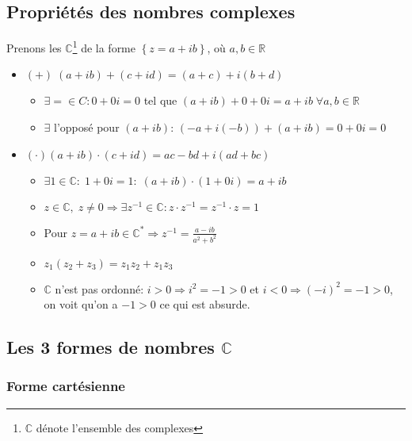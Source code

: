\documentclass[10pt,a4paper]{book}
\newcommand{\R}{\mathbb{R}}
\newcommand{\C}{\mathbb{C}}
\begin{document}
\subsection{Propriétés des nombres complexes}
Prenons les $\C$\footnote{$\C$ dénote l'ensemble des complexes} de la forme $\left\lbrace z = a +ib\right\rbrace$, où $a,b\in \R$
\begin{itemize}
\item $(+) \; (a+ib)+(c+id) = (a+c) + i(b+d)$
\begin{itemize}
\item $\exists = \in C: 0+0i = 0$ tel que $(a+ib) + 0 + 0i = a+ib\; \forall a,b\in \R$
\item $\exists$ l'opposé pour $(a+ib)$: $(-a + i(-b)) + (a+ib) = 0+0i=0$
\end{itemize}
\item $(\cdot ) (a+ib)\cdot (c+id) = ac-bd + i(ad+bc)$
\begin{itemize}
\item $\exists 1 \in \C:\; 1+0i=1:\; (a+ib)\cdot (1+0i) = a+ib$
\item $z\in \C ,\; z\neq 0 \Rightarrow \exists z^{-1}\in \C: z\cdot z^{-1} = z^{-1}\cdot z = 1$
\item Pour $z = a+ib\in \C^* \Rightarrow z^{-1} = \frac{a-ib}{a^2+b^2}$
\item $z_1(z_2 + z_3) = z_1z_2 + z_1z_3$
\item $\C$ n'est pas ordonné: $i > 0 \Rightarrow i^2 = -1 > 0$ et $i < 0 \Rightarrow (-i)^2 = -1 > 0$, on voit qu'on a $-1>0$ ce qui est absurde.
\end{itemize}
\end{itemize}

\subsection{Les 3 formes de nombres \texorpdfstring{$\C$}{complexes}}

\subsubsection{Forme cartésienne}
\end{document}
